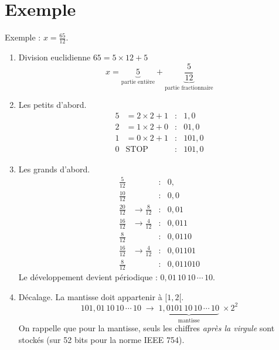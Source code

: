   \section{Exemple}
Exemple  : $x=\frac{65}{12}$.
\begin{enumerate}
  \item Division euclidienne $65 = 5 \times 12 +5$ 
\begin{displaymath}
  x = \underset{\text{partie entière}}{\underbrace{5}} + \underset{\text{partie fractionnaire}}{\underbrace{\frac{5}{12}}}
\end{displaymath}

  \item \og Les petits d'abord.\fg
\begin{displaymath}
\renewcommand{\arraystretch}{1.7}
\begin{array}{lccc}
5& = 2\times 2 + 1                           &:  & 1,0  \\
2& = 1\times 2 + 0                           &:  & 01,0  \\
1& = 0\times 2 + 1                           &:  & 101,0  \\
0& \text{STOP}                               & :  & 101,0
\end{array}
\end{displaymath}


  \item \og Les grands d'abord.\fg
\begin{displaymath}
\renewcommand{\arraystretch}{1.7}
\begin{array}{lccc}
\frac{5}{12}&                                &:  & 0,  \\
\frac{10}{12}&                               &:  & 0,0  \\
\frac{20}{12}&\rightarrow \frac{8}{12}       &:  & 0,01  \\
\frac{16}{12}&\rightarrow \frac{4}{12}       &:  & 0,011  \\
\frac{8}{12}&                                &:  & 0,0110  \\
\frac{16}{12}&\rightarrow \frac{4}{12}       &:  & 0,01101  \\
\frac{8}{12}&                                &:  & 0,011010  
\end{array}
\end{displaymath}
Le développement devient périodique : $0,01\,10\,10\,\cdots \,10$.

  \item Décalage. La mantisse doit appartenir à $[1,2[$.
\begin{displaymath}
  101,01\,10\,10\,\cdots \,10 \;\rightarrow \; \underset{\text{mantisse}}{\underbrace{1,0101\,10\,10\,\cdots \,10}}\;\times 2^2
\end{displaymath}
On rappelle que pour la mantisse, seuls les chiffres \emph{après la virgule} sont stockés (sur 52 bits pour la norme IEEE 754).
\end{enumerate}


